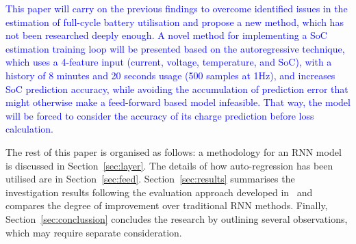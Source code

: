 %
%
\textcolor{blue}{This paper will carry on the previous findings to overcome identified issues in the estimation of full-cycle battery utilisation and propose a new method, which has not been researched deeply enough.
A novel method for implementing a SoC estimation training loop will be presented based on the autoregressive technique, which uses a 4-feature input (current, voltage, temperature, and SoC), with a history of 8 minutes and 20 seconds usage (500 samples at 1Hz), and increases SoC prediction accuracy, while avoiding the accumulation of prediction error that might otherwise make a feed-forward based model infeasible.
That way, the model will be forced to consider the accuracy of its charge prediction before loss calculation.}

%
%
The rest of this paper is organised as follows: a methodology for an RNN model is discussed in Section~\ref{sec:layer}.
The details of how auto-regression has been utilised are in Section~\ref{sec:feed}.
Section~\ref{sec:results} summarises the investigation results following the evaluation approach developed in~\cite{sadykov_practical_2022} and compares the degree of improvement over traditional RNN methods.
Finally, Section~\ref{sec:conclussion} concludes the research by outlining several observations, which may require separate consideration.
